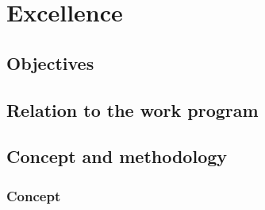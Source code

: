 \chapter{Excellence}



\section{Objectives}



\section{Relation to the work program}



\section{Concept and methodology}

\subsection{Concept}\label{concept}

  



